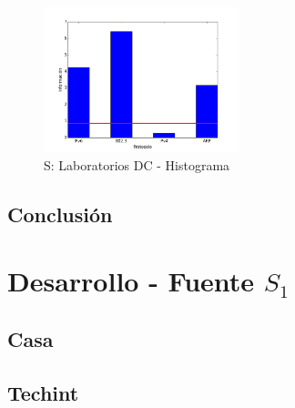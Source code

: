\documentclass[final,narroweqnarray,inline]{ieee}
\begin{document}
    \begin{figure}[ht]\begin{center}
      \includegraphics[width=0.5\textwidth]{../output/labos-dc-30m-s-histogram.png}
      \caption{S: Laboratorios DC - Histograma}
      \label{labos-dc-30m-s-histogram}
    \end{center}\end{figure}


  \subsection{Conclusión}

\newpage
\section{Desarrollo - Fuente $S_1$}
  \subsection{Casa}

  \subsection{Techint}

\end{document}
